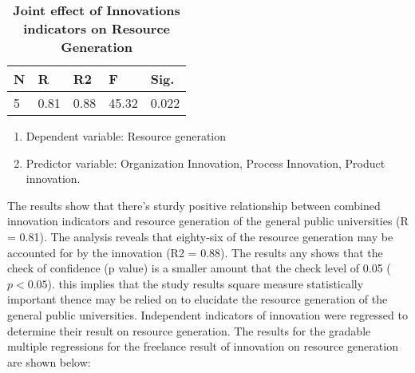\begin{table}[ht]
    \centering
\begin{tabular}{|l|l|l|l|l|}
\hline
   \textbf{N} & \textbf{R} & \textbf{R2} & \textbf{F} & \textbf{Sig.}\\ \hline
   5 & 0.81 & 0.88 & 45.32 & 0.022\\ \hline   
\end{tabular}
    \caption{\textbf{Joint effect of Innovations indicators on Resource Generation}}
\end{table}

\begin{enumerate}
    \item Dependent variable: Resource generation
    \item Predictor variable: Organization Innovation, Process Innovation, Product innovation.
\end{enumerate}

The results show that there's sturdy positive relationship between combined innovation indicators and resource generation of the general public universities (R = 0.81). The analysis reveals that eighty-six of the resource generation may be accounted for by the innovation (R2 = 0.88). The results any shows that the check of confidence (p value) is a smaller amount that the check level of 0.05 ($p < 0.05$). this implies that the study results square measure statistically important thence may be relied on to elucidate the resource generation of the general public universities.
Independent indicators of innovation were regressed to determine their result on resource generation. The results for the gradable multiple regressions for the freelance result of innovation on resource generation are shown below:


